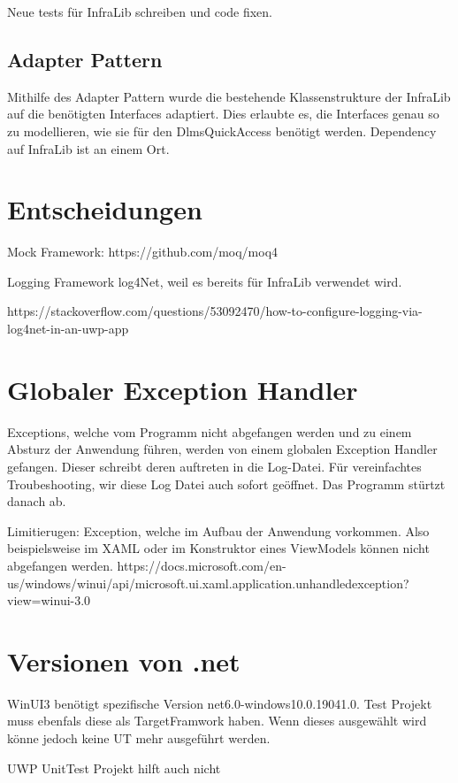 Neue tests für InfraLib schreiben und code fixen.

\subsection{Adapter Pattern}

Mithilfe des Adapter Pattern wurde die bestehende Klassenstrukture der InfraLib auf die benötigten Interfaces adaptiert.
Dies erlaubte es, die Interfaces genau so zu modellieren, wie sie für den DlmsQuickAccess benötigt werden.
Dependency auf InfraLib ist an einem Ort.


\section{Entscheidungen}

Mock Framework:
https://github.com/moq/moq4


Logging Framework
log4Net, weil es bereits für InfraLib verwendet wird. 

https://stackoverflow.com/questions/53092470/how-to-configure-logging-via-log4net-in-an-uwp-app

\section{Globaler Exception Handler}

Exceptions, welche vom Programm nicht abgefangen werden und zu einem Absturz der Anwendung führen, werden von einem globalen Exception Handler gefangen.
Dieser schreibt deren auftreten in die Log-Datei. Für vereinfachtes Troubeshooting, wir diese Log Datei auch sofort geöffnet. Das Programm stürtzt danach ab.

Limitierugen:
Exception, welche im Aufbau der Anwendung vorkommen. Also beispielsweise im XAML oder im Konstruktor eines ViewModels können nicht abgefangen werden.
https://docs.microsoft.com/en-us/windows/winui/api/microsoft.ui.xaml.application.unhandledexception?view=winui-3.0


\section{Versionen von .net}
WinUI3 benötigt spezifische Version net6.0-windows10.0.19041.0.
Test Projekt muss ebenfals diese als TargetFramwork haben.
Wenn dieses ausgewählt wird könne jedoch keine UT mehr ausgeführt werden.

UWP UnitTest Projekt hilft auch nicht

